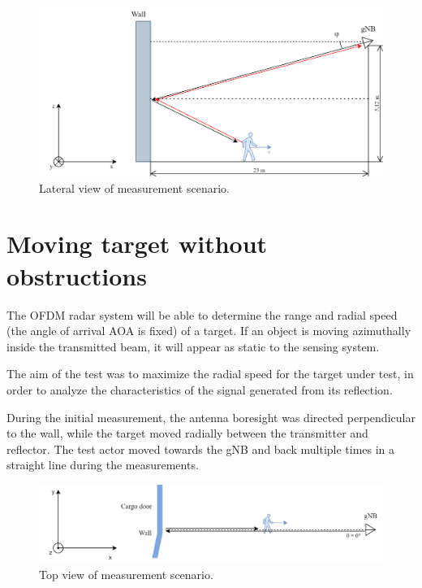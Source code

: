 \begin{figure}[H]
	\centering
	\includegraphics[width=1\textwidth]{Images/Test1/base-lateral_view}
	\caption{Lateral view of measurement scenario.}
	\label{fig:Test1_base-lateral_view}
\end{figure}

\section{Moving target without obstructions}

The OFDM radar system will be able to determine the range and radial speed (the angle of arrival AOA is fixed) of a target. If an object is moving azimuthally inside the transmitted beam, it will appear as static to the sensing system.

The aim of the test was to maximize the radial speed for the target under test, in order to analyze the characteristics of the signal generated from its reflection.

During the initial measurement, the antenna boresight was directed perpendicular to the wall, while the target moved radially between the transmitter and reflector. The test actor moved towards the gNB and back multiple times in a straight line during the measurements.

\begin{figure}[H]
	\centering
	\includegraphics[width=1\textwidth]{Images/Test1/base-top_view}
	\caption{Top view of measurement scenario.}
	\label{fig:Test1_base-top_view}
\end{figure}


